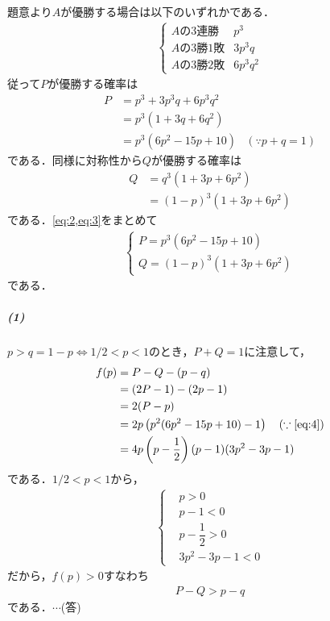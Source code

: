 \documentclass[../../main.tex]{subfiles}
\begin{document}
題意より$A$が優勝する場合は以下のいずれかである．
\begin{align}
  \begin{cases}
    \text{$A$の$3$連勝}&p^3 \\
    \text{$A$の$3$勝$1$敗}& 3p^3q \\
    \text{$A$の$3$勝$2$敗}& 6p^3q^2
  \end{cases}\label{eq:1}
\end{align}
従って$P$が優勝する確率は
\begin{align}
  P  &=p^3+3p^3q+6p^3q^2 \nonumber\\
  &=p^3(1+3q+6q^2) \nonumber\\
  &=p^3(6p^2-15p+10)&(\because p+q=1)\label{eq:2}
\end{align}
である．同様に対称性から$Q$が優勝する確率は
\begin{align}
  Q
  &=q^3(1+3p+6p^2) \\
  &=(1-p)^3(1+3p+6p^2) \label{eq:3}
\end{align}
である．\cref{eq:2,eq:3}をまとめて
\begin{align}
  \begin{cases}
    P = p^3(6p^2-15p+10) \\
    Q = (1-p)^3(1+3p+6p^2)
  \end{cases} \label{eq:4}
\end{align}
である．

\subparagraph{(1)}

$p>q =1-p \Longleftrightarrow 1/2<p<1$のとき，$P+Q=1$に注意して，
\begin{align}
  f(p)
  &=P-Q-(p-q) \\
  &=(2P-1)-(2p-1) \\
  &=2(P-p) \\
  &=2p\left(p^2(6p^2-15p+10)-1\right) \quad (\because\text{\cref{eq:4}})\\
  &=4p\left(p-\dfrac{1}{2}\right)(p-1)(3p^2-3p-1) \label{eq:5}
\end{align}
である．$1/2<p<1$から，
\begin{align}
  \begin{cases}
    &p>0 \\
    &p-1<0 \\
    &p-\dfrac{1}{2}>0 \\
    &3p^2-3p-1<0
  \end{cases}
\end{align}
だから，$f(p)>0$すなわち
\begin{align}
  P-Q>p-q
\end{align}
である．$\cdots$(答)
\end{document}
